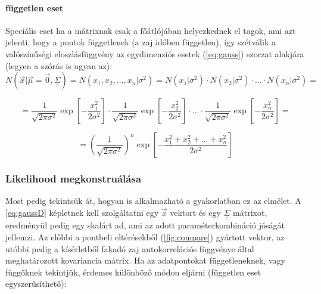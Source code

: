 \paragraph{független eset}
Speciális eset ha a mátrixnak csak a főátlójában helyezkednek el tagok, ami azt jelenti, hogy a pontok függetlenek (a zaj időben független), így szétválik a valószínűségi eloszlásfüggvény az egydimenziós esetek (\ref{eq:gauss}) szorzat alakjára (legyen a szórás is ugyan az):
\begin{equation}\label{eq:gauss_independent}
		N\left(\vec{x}|\vec{\mu}=\vec{0}, \underline{\underline{ \Sigma }}\right) = N\left(x_1, x_2, \ldots, x_n| \sigma^2\right) = N\left(x_1| \sigma^2\right)\cdot N\left( x_2| \sigma^2\right) \cdot \ldots \cdot N\left( x_n| \sigma^2\right) = 
\end{equation}

\begin{equation}
		= \dfrac{1}{\sqrt{2\pi \sigma^2}}\exp \left[-\dfrac{x_1^2}{2\sigma^2}\right] \cdot \dfrac{1}{\sqrt{2\pi \sigma^2}}\exp\left[-\dfrac{x_2^2}{2\sigma^2}\right] \cdot \ldots \cdot \dfrac{1}{\sqrt{2\pi \sigma^2}}\exp \left[-\dfrac{x_n^2}{2\sigma^2}\right] =
\end{equation}

\begin{equation}
	=  \left(\dfrac{1}{\sqrt{2\pi \sigma^2}}\right)^n \exp \left[-\dfrac{x_1^2 + x_2^2 + \ldots + x_n^2}{2\sigma^2}\right]
\end{equation}


\subsubsection{Likelihood megkonstruálása}
Most pedig tekintsük át, hogyan is alkalmazható a gyakorlatban ez az elmélet. A \ref{eq:gaussD} képletnek kell szolgáltatni egy $\vec{x}$ vektort és egy $\underline{\underline{\Sigma}}$ mátrixot, eredményül pedig egy skalárt ad, ami az adott paraméterkombináció jóságát jellemzi. Az előbbi a pontbeli eltérésekből (\ref{fig:compare}) gyártott vektor, az utóbbi pedig a kísérletből fakadó zaj autokorrelációs függvénye által meghatározott kovariancia mátrix.
Ha az adatpontokat függetleneknek, vagy függőknek tekintjük, érdemes különböző módon eljárni (független eset egyszerűsíthető):
 
